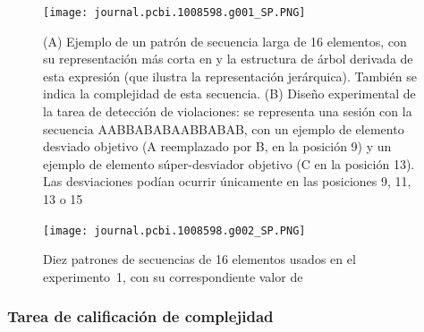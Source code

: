 \begin{figure}[t!]
   \texttt{[image: journal.pcbi.1008598.g001\_SP.PNG]}
   
   \centering
   
   \caption{(A) Ejemplo de un patrón de secuencia larga de 16 elementos, con su representación más corta en \grambin y la estructura de árbol derivada de esta expresión (que ilustra la representación jerárquica). También se indica la complejidad \mdlbin de esta secuencia. (B) Diseño experimental de la tarea de detección de violaciones: se representa una sesión con la secuencia AABBABABAABBABAB, con un ejemplo de elemento desviado objetivo (A reemplazado por B, en la posición 9) y un ejemplo de elemento súper-desviador objetivo (C en la posición 13). Las desviaciones podían ocurrir únicamente en las posiciones 9, 11, 13 o 15}
   \label{PlosBIO-F1}
\end{figure}

\begin{figure}[t!]
   \texttt{[image: journal.pcbi.1008598.g002\_SP.PNG]}
   \centering
   \caption{Diez patrones de secuencias de 16 elementos usados en el experimento~1, con su correspondiente valor de \mdlbin}
   \label{PlosBIO-F2}
\end{figure}

\subsubsection*{Tarea de calificación de complejidad}


